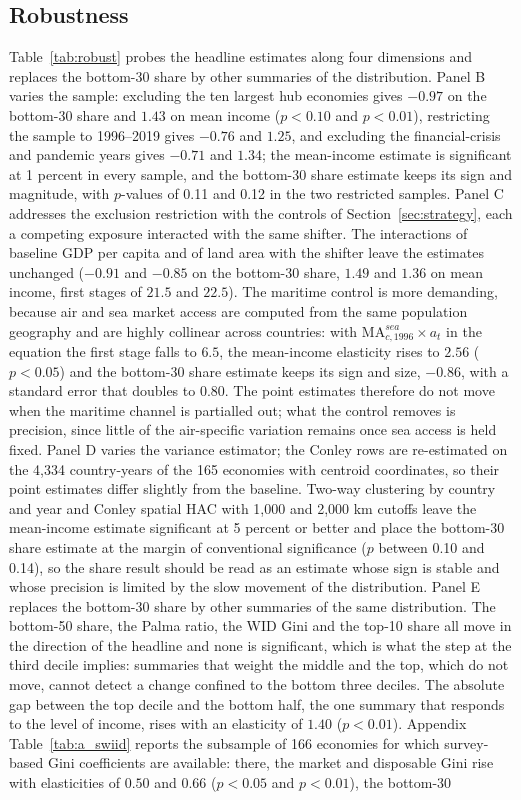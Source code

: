 \subsection{Robustness}
\label{sec:robust}
Table~\ref{tab:robust} probes the headline estimates along four dimensions and replaces the bottom-30 share by other summaries of the distribution. Panel B varies the sample: excluding the ten largest hub economies gives $-0.97$ on the bottom-30 share and $1.43$ on mean income ($p<0.10$ and $p<0.01$), restricting the sample to 1996--2019 gives $-0.76$ and $1.25$, and excluding the financial-crisis and pandemic years gives $-0.71$ and $1.34$; the mean-income estimate is significant at 1 percent in every sample, and the bottom-30 share estimate keeps its sign and magnitude, with $p$-values of 0.11 and 0.12 in the two restricted samples. Panel C addresses the exclusion restriction with the controls of Section~\ref{sec:strategy}, each a competing exposure interacted with the same shifter. The interactions of baseline GDP per capita and of land area with the shifter leave the estimates unchanged ($-0.91$ and $-0.85$ on the bottom-30 share, $1.49$ and $1.36$ on mean income, first stages of $21.5$ and $22.5$). The maritime control is more demanding, because air and sea market access are computed from the same population geography and are highly collinear across countries: with $\mathrm{MA}^{sea}_{c,1996}\times a_t$ in the equation the first stage falls to $6.5$, the mean-income elasticity rises to $2.56$ ($p<0.05$) and the bottom-30 share estimate keeps its sign and size, $-0.86$, with a standard error that doubles to $0.80$. The point estimates therefore do not move when the maritime channel is partialled out; what the control removes is precision, since little of the air-specific variation remains once sea access is held fixed. Panel D varies the variance estimator; the Conley rows are re-estimated on the 4{,}334 country-years of the 165 economies with centroid coordinates, so their point estimates differ slightly from the baseline. Two-way clustering by country and year and Conley spatial HAC with 1{,}000 and 2{,}000 km cutoffs \citep{Conley_1999} leave the mean-income estimate significant at 5 percent or better and place the bottom-30 share estimate at the margin of conventional significance ($p$ between 0.10 and 0.14), so the share result should be read as an estimate whose sign is stable and whose precision is limited by the slow movement of the distribution. Panel E replaces the bottom-30 share by other summaries of the same distribution. The bottom-50 share, the Palma ratio, the WID Gini and the top-10 share all move in the direction of the headline and none is significant, which is what the step at the third decile implies: summaries that weight the middle and the top, which do not move, cannot detect a change confined to the bottom three deciles. The absolute gap between the top decile and the bottom half, the one summary that responds to the level of income, rises with an elasticity of $1.40$ ($p<0.01$). Appendix Table~\ref{tab:a_swiid} reports the subsample of 166 economies for which survey-based Gini coefficients are available: there, the market and disposable Gini rise with elasticities of $0.50$ and $0.66$ ($p<0.05$ and $p<0.01$), the bottom-30 